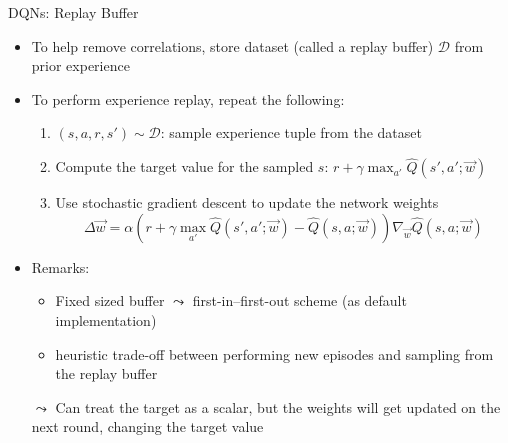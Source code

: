 \begin{frame}[c]{DQNs: Replay Buffer}
	
	\begin{itemize}
		\item To help remove correlations, store dataset (called a \alert{replay buffer}) $\mathcal{D}$ from prior experience
		\item To perform experience replay, repeat the following:
		\begin{enumerate}
			\item $(s,a,r,s')\sim \mathcal{D}$: sample experience tuple from the dataset
			\item Compute the target value for the sampled $s$: $r+\gamma \max_{a'} \hat{Q}(s',a';\vec{w})$
			\item Use stochastic gradient descent to update the network weights
			$$\Delta \vec{w} = \alpha (r + \gamma \max_{a'} \hat{Q}(s',a';\vec{w}) - \hat{Q}(s,a;\vec{w})) \nabla_{\vec{w}}\hat{Q}(s,a;\vec{w})$$
		\end{enumerate}
		\pause
		\item Remarks:
		\begin{itemize}
			\item Fixed sized buffer $\leadsto$ first-in--first-out scheme (as default implementation)
			\item heuristic trade-off between performing new episodes and sampling from the replay buffer
		\end{itemize}
			
		\medskip
		\pause
		\item[$\leadsto$] Can treat the target as a scalar, but the weights will get
		updated on the next round, changing the target value
	\end{itemize}
	
\end{frame}
